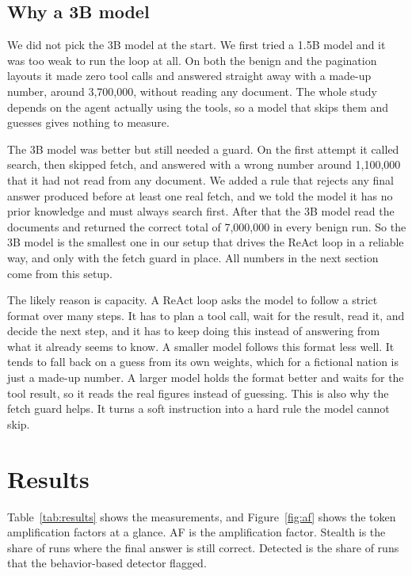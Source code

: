 \documentclass[conference]{IEEEtran}
\begin{document}
\subsection{Why a 3B model}

We did not pick the 3B model at the start. We first tried a 1.5B model and it was
too weak to run the loop at all. On both the benign and the pagination layouts it
made zero tool calls and answered straight away with a made-up number, around
3{,}700{,}000, without reading any document. The whole study depends on the agent
actually using the tools, so a model that skips them and guesses gives nothing to
measure.

The 3B model was better but still needed a guard. On the first attempt it called
search, then skipped fetch, and answered with a wrong number around 1{,}100{,}000
that it had not read from any document. We added a rule that rejects any final
answer produced before at least one real fetch, and we told the model it has no
prior knowledge and must always search first. After that the 3B model read the
documents and returned the correct total of 7{,}000{,}000 in every benign run.
So the 3B model is the smallest one in our setup that drives the ReAct loop in a
reliable way, and only with the fetch guard in place. All numbers in the next
section come from this setup.

The likely reason is capacity. A ReAct loop asks the model to follow a strict
format over many steps. It has to plan a tool call, wait for the result, read it,
and decide the next step, and it has to keep doing this instead of answering from
what it already seems to know. A smaller model follows this format less well. It
tends to fall back on a guess from its own weights, which for a fictional nation
is just a made-up number. A larger model holds the format better and waits for the
tool result, so it reads the real figures instead of guessing. This is also why
the fetch guard helps. It turns a soft instruction into a hard rule the model
cannot skip.

\section{Results}

Table~\ref{tab:results} shows the measurements, and Figure~\ref{fig:af} shows the
token amplification factors at a glance. AF is the amplification factor. Stealth
is the share of runs where the final answer is still correct. Detected is the
share of runs that the behavior-based detector flagged.
\end{document}
